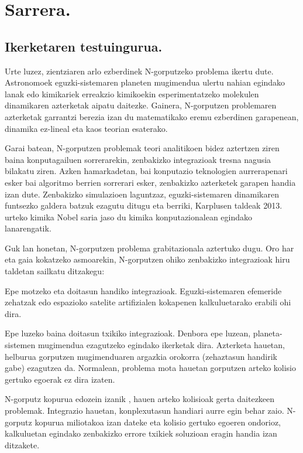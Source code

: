 \chapter{Sarrera.}


\section{Ikerketaren testuingurua.}

Urte luzez, zientziaren arlo ezberdinek N-gorputzeko problema ikertu dute. Astronomoek eguzki-sistemaren planeten mugimendua ulertu nahian egindako lanak edo kimikariek erreakzio kimikoekin esperimentatzeko molekulen dinamikaren azterketak aipatu daitezke. Gainera,  N-gorputzen problemaren azterketak garrantzi berezia izan du matematikako eremu ezberdinen garapenean,  dinamika ez-lineal eta kaos teorian esaterako. 

Garai batean, N-gorputzen problemak teori analitikoen bidez aztertzen ziren baina konputagailuen sorrerarekin, zenbakizko integrazioak tresna nagusia bilakatu ziren. Azken hamarkadetan, bai konputazio teknologien aurrerapenari esker bai algoritmo berrien sorrerari esker, zenbakizko azterketek garapen handia izan dute. Zenbakizko simulazioen laguntzaz, eguzki-sistemaren dinamikaren funtsezko galdera batzuk ezagutu ditugu eta berriki, Karplusen taldeak 2013. urteko kimika Nobel saria \cite{Karplus2014} jaso du kimika konputazionalean egindako lanarengatik.       

Guk lan honetan, N-gorputzen problema grabitazionala aztertuko dugu. Oro har eta gaia kokatzeko asmoarekin, N-gorputzen ohiko zenbakizko  integrazioak hiru taldetan sailkatu ditzakegu:
\begin{enumerate}
{
\item Epe motzeko eta doitasun handiko integrazioak. 
 Eguzki-sistemaren efemeride zehatzak \cite{Folkner2014} edo espazioko satelite artifizialen kokapenen \cite{Beylkin2014} kalkuluetarako erabili ohi dira.
\item Epe luzeko baina doitasun txikiko integrazioak.
 Denbora epe luzean, planeta-sistemen mugimendua ezagutzeko egindako ikerketak dira. Azterketa hauetan, helburua gorputzen mugimenduaren argazkia orokorra (zehaztasun handirik gabe) ezagutzea da. Normalean, problema mota hauetan gorputzen arteko kolisio gertuko egoerak ez dira izaten.     
\item N-gorputz kopurua edozein izanik , hauen arteko kolisioak gerta daitezkeen problemak.
 Integrazio hauetan, konplexutasun handiari aurre egin behar zaio. N-gorputz kopurua miliotakoa \cite{Ishiyama2012} izan dateke eta kolisio gertuko egoeren ondorioz, kalkuluetan egindako zenbakizko errore txikiek soluzioan eragin handia izan ditzakete.    
}
\end{enumerate}

